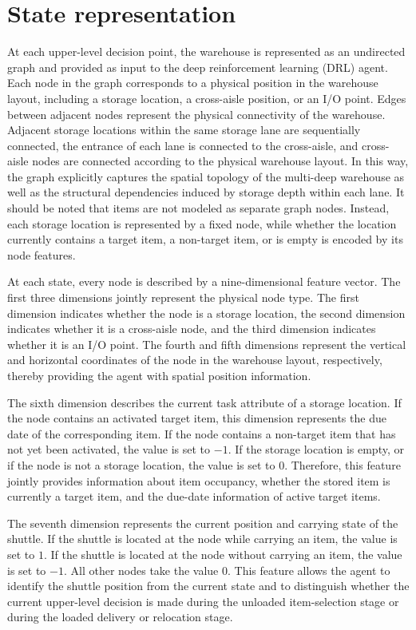 \section{State representation}
At each upper-level decision point, the warehouse is represented as an undirected graph and provided as input to the deep reinforcement learning (DRL) agent. Each node in the graph corresponds to a physical position in the warehouse layout, including a storage location, a cross-aisle position, or an I/O point. Edges between adjacent nodes represent the physical connectivity of the warehouse. Adjacent storage locations within the same storage lane are sequentially connected, the entrance of each lane is connected to the cross-aisle, and cross-aisle nodes are connected according to the physical warehouse layout. In this way, the graph explicitly captures the spatial topology of the multi-deep warehouse as well as the structural dependencies induced by storage depth within each lane. It should be noted that items are not modeled as separate graph nodes. Instead, each storage location is represented by a fixed node, while whether the location currently contains a target item, a non-target item, or is empty is encoded by its node features.

At each state, every node is described by a nine-dimensional feature vector. The first three dimensions jointly represent the physical node type. The first dimension indicates whether the node is a storage location, the second dimension indicates whether it is a cross-aisle node, and the third dimension indicates whether it is an I/O point. The fourth and fifth dimensions represent the vertical and horizontal coordinates of the node in the warehouse layout, respectively, thereby providing the agent with spatial position information.

The sixth dimension describes the current task attribute of a storage location. If the node contains an activated target item, this dimension represents the due date of the corresponding item. If the node contains a non-target item that has not yet been activated, the value is set to $-1$. If the storage location is empty, or if the node is not a storage location, the value is set to $0$. Therefore, this feature jointly provides information about item occupancy, whether the stored item is currently a target item, and the due-date information of active target items.

The seventh dimension represents the current position and carrying state of the shuttle. If the shuttle is located at the node while carrying an item, the value is set to $1$. If the shuttle is located at the node without carrying an item, the value is set to $-1$. All other nodes take the value $0$. This feature allows the agent to identify the shuttle position from the current state and to distinguish whether the current upper-level decision is made during the unloaded item-selection stage or during the loaded delivery or relocation stage.

